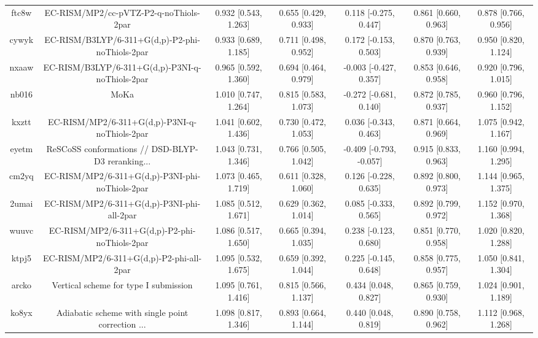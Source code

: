 \documentclass{article}
\begin{document}
\begin{center}
\begin{longtable}{|ccccccc|}
 ftc8w &             EC-RISM/MP2/cc-pVTZ-P2-q-noThiols-2par &  0.932 [0.543, 1.263] &  0.655 [0.429, 0.933] &    0.118 [-0.275, 0.447] &  0.861 [0.660, 0.963] &   0.878 [0.766, 0.956] \\
 cywyk &    EC-RISM/B3LYP/6-311+G(d,p)-P2-phi-noThiols-2par &  0.933 [0.689, 1.185] &  0.711 [0.498, 0.952] &    0.172 [-0.153, 0.503] &  0.870 [0.763, 0.939] &   0.950 [0.820, 1.124] \\
 nxaaw &    EC-RISM/B3LYP/6-311+G(d,p)-P3NI-q-noThiols-2par &  0.965 [0.592, 1.360] &  0.694 [0.464, 0.979] &   -0.003 [-0.427, 0.357] &  0.853 [0.646, 0.958] &   0.920 [0.796, 1.015] \\
 nb016 &                                               MoKa &  1.010 [0.747, 1.264] &  0.815 [0.583, 1.073] &   -0.272 [-0.681, 0.140] &  0.872 [0.785, 0.937] &   0.960 [0.796, 1.152] \\
 kxztt &      EC-RISM/MP2/6-311+G(d,p)-P3NI-q-noThiols-2par &  1.041 [0.602, 1.436] &  0.730 [0.472, 1.053] &    0.036 [-0.343, 0.463] &  0.871 [0.664, 0.969] &   1.075 [0.942, 1.167] \\
 eyetm &  ReSCoSS conformations // DSD-BLYP-D3 reranking... &  1.043 [0.731, 1.346] &  0.766 [0.505, 1.042] &  -0.409 [-0.793, -0.057] &  0.915 [0.833, 0.963] &   1.160 [0.994, 1.295] \\
 cm2yq &    EC-RISM/MP2/6-311+G(d,p)-P3NI-phi-noThiols-2par &  1.073 [0.465, 1.719] &  0.611 [0.328, 1.060] &    0.126 [-0.228, 0.635] &  0.892 [0.800, 0.973] &   1.144 [0.965, 1.375] \\
 2umai &         EC-RISM/MP2/6-311+G(d,p)-P3NI-phi-all-2par &  1.085 [0.512, 1.671] &  0.629 [0.362, 1.014] &    0.085 [-0.333, 0.565] &  0.892 [0.799, 0.972] &   1.152 [0.970, 1.368] \\
 wuuvc &      EC-RISM/MP2/6-311+G(d,p)-P2-phi-noThiols-2par &  1.086 [0.517, 1.650] &  0.665 [0.394, 1.035] &    0.238 [-0.123, 0.680] &  0.851 [0.770, 0.958] &   1.020 [0.820, 1.288] \\
 ktpj5 &           EC-RISM/MP2/6-311+G(d,p)-P2-phi-all-2par &  1.095 [0.532, 1.675] &  0.659 [0.392, 1.044] &    0.225 [-0.145, 0.648] &  0.858 [0.775, 0.957] &   1.050 [0.841, 1.304] \\
 arcko &              Vertical scheme for type I submission &  1.095 [0.761, 1.416] &  0.815 [0.566, 1.137] &     0.434 [0.048, 0.827] &  0.865 [0.759, 0.930] &   1.024 [0.901, 1.189] \\
 ko8yx &  Adiabatic scheme with single point correction ... &  1.098 [0.817, 1.346] &  0.893 [0.664, 1.144] &     0.440 [0.048, 0.819] &  0.890 [0.758, 0.962] &   1.112 [0.968, 1.268] \\

\end{longtable}
\end{center}
\end{document}
